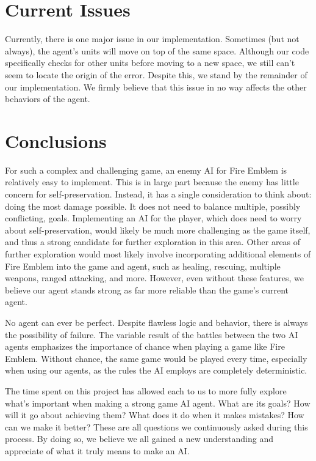 \documentclass[12pt]{article} %
\begin{document}
\section{Current Issues}
Currently, there is one major issue in our implementation. Sometimes (but not always), the agent’s units will move on top of the same space. Although our code specifically checks for other units before moving to a new space, we still can’t seem to locate the origin of the error. Despite this, we stand by the remainder of our implementation. We firmly believe that this issue in no way affects the other behaviors of the agent.

\section{Conclusions}
	For such a complex and challenging game, an enemy AI for Fire Emblem is relatively easy to implement. This is in large part because the enemy has little concern for self-preservation. Instead, it has a single consideration to think about: doing the most damage possible. It does not need to balance multiple, possibly conflicting, goals. Implementing an AI for the player, which does need to worry about self-preservation, would likely be much more challenging as the game itself, and thus a strong candidate for further exploration in this area. Other areas of further exploration would most likely involve incorporating additional elements of Fire Emblem into the game and agent, such as healing, rescuing, multiple weapons, ranged attacking, and more. However, even without these features, we believe our agent stands strong as far more reliable than the game’s current agent.

	No agent can ever be perfect. Despite flawless logic and behavior, there is always the possibility of failure. The variable result of the battles between the two AI agents emphasizes the importance of chance when playing a game like Fire Emblem. Without chance, the same game would be played every time, especially when using our agents, as the rules the AI employs are completely deterministic.

	The time spent on this project has allowed each to us to more fully explore what’s important when making a strong game AI agent. What are its goals? How will it go about achieving them? What does it do when it makes mistakes? How can we make it better? These are all questions we continuously asked during this process. By doing so, we believe we all gained a new understanding and appreciate of what it truly means to make an AI.
\end{document}
